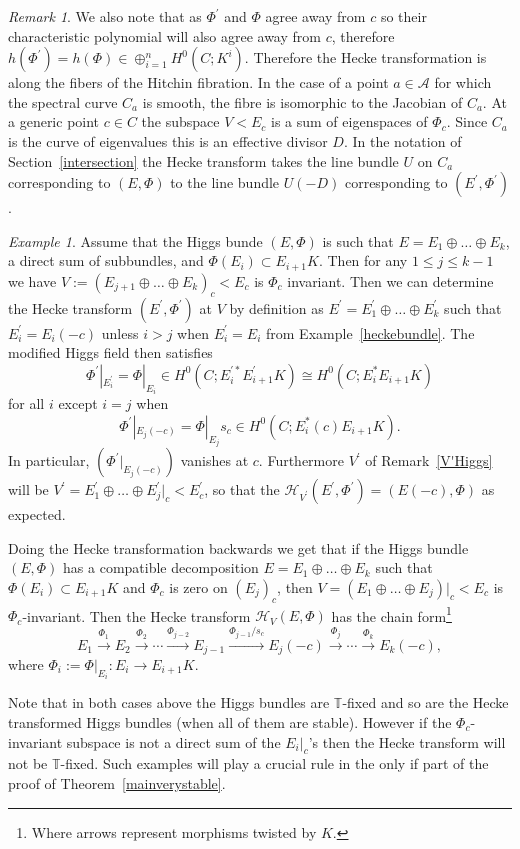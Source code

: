 \documentclass[12pt]{article}
\numberwithin{equation}{section}
\theoremstyle{remark}
\newtheorem{remark}[theorem]{Remark}
\newtheorem{example}[theorem]{Example}
\theoremstyle{definition}
\numberwithin{theorem}{section}
\def\calH{\mathcal{H}}
\newcommand{\T}{{\mathbb{T}}}
\renewcommand{\1}{\mathbbm{1}}
\begin{document}
\begin{remark}\label{alonghitchin} We also note that as $\Phi^\prime$ and $\Phi$ agree away from $c$ so  their characteristic polynomial will also agree away from $c$, therefore $h(\Phi^\prime)=h(\Phi)\in \oplus_{i=1}^n H^0(C;K^i)$. Therefore the Hecke transformation is along the fibers of the Hitchin fibration. In the case of a point $a\in {\mathcal A}$ for which  the spectral curve $C_a$ is smooth, the fibre is isomorphic to the Jacobian of $C_a$. At a generic point $c\in C$ the subspace $V<E_c$ is a sum of  eigenspaces of $\Phi_c$. Since $C_a$ is the curve of eigenvalues this is an effective  divisor $D$. In the notation of Section~\ref{intersection} the Hecke transform takes the line bundle $U$ on $C_a$ corresponding to $(E,\Phi)$  to the line bundle $U(-D)$ corresponding to $(E^\prime,\Phi^\prime)$. 
\end{remark}

\begin{example}\label{invarianthecke} Assume that the Higgs bunde $(E,\Phi)$ is such that $E=E_1\oplus \dots \oplus E_k$, a direct sum of subbundles, and $\Phi(E_i)\subset E_{i+1}K$. Then for any $1\leq j \leq k-1$ we have  $V:=(E_{j+1}\oplus \dots \oplus E_k)_c<E_c$ is $\Phi_c$ invariant. Then we can determine the Hecke transform $(E^\prime,\Phi^\prime)$ at $V$ by definition as $E^\prime=E_1^\prime \oplus \dots \oplus E^\prime_k$ such that $E_i^\prime=E_i(-c)$ unless $i>j$ when $E_i^\prime=E_i$ from Example~\ref{heckebundle}.  The modified Higgs field then satisfies $$\Phi^\prime|_{E^\prime_i}=\Phi|_{E_i}\in H^0(C;E_i^{\prime*}E^\prime_{i+1}K)\cong H^0(C;E_i^*E_{i+1}K)$$ for all $i$ except $i=j$ when $$\Phi^\prime|_{E_{j}(-c)}=\Phi|_{E_j}s_c\in H^0(C;E_i^*(c)E_{i+1}K).$$ In particular, $(\Phi^\prime|_{E_{j}(-c)})$ vanishes at $c$. 
Furthermore $V^\prime$ of Remark~\ref{V'Higgs} will be $V^\prime=E^\prime_1\oplus \dots \oplus E^\prime_{j}|_c<E^\prime_c$, so that the $\calH_{V^\prime}(E^\prime,\Phi^\prime)=(E(-c),\Phi)$ as expected.

Doing the Hecke transformation backwards we get that if the Higgs bundle $(E,\Phi)$ has a compatible decomposition $E=E_1\oplus\dots\oplus E_k$ such that $\Phi(E_i)\subset E_{i+1}K$ and $\Phi_c$ is zero on $(E_j)_c$, then $V=(E_1\oplus \dots \oplus E_{j})|_c<E_c$ is $\Phi_c$-invariant.  Then the Hecke transform
$\calH_{V}(E,\Phi)$ has the chain form\footnote{Where arrows represent morphisms twisted by $K$.}
$$E_1\stackrel{\Phi_1}{\longrightarrow}{E_2}\stackrel{\Phi_2}{\longrightarrow}\cdots \stackrel{\Phi_{j-2}}{\longrightarrow}E_{j-1} \stackrel{\Phi_{j-1}/s_c}{\longrightarrow} E_j(-c)\stackrel{\Phi_{j}}{\longrightarrow}\cdots \stackrel{\Phi_{k}}{\longrightarrow}{E_k(-c)},$$ where $\Phi_i:=\Phi|_{E_i}:E_i\to E_{i+1}K$. 

Note that in both cases above the Higgs bundles are $\T$-fixed and so are the Hecke transformed Higgs bundles (when all of them are stable). However if the $\Phi_c$-invariant subspace is not a direct sum of the $E_i|_c$'s then  the Hecke transform will not be $\T$-fixed. Such examples will play a crucial rule in the only if part of the proof of Theorem~\ref{mainverystable}. 

	\end{example}
\end{document}
